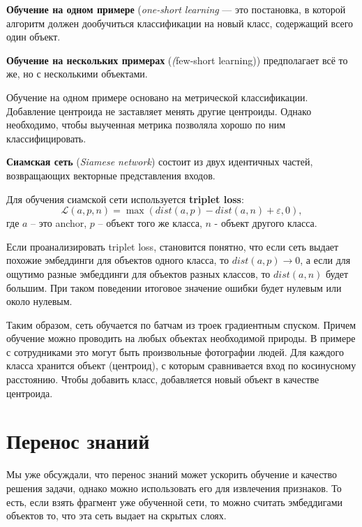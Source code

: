 \begin{definition}
    \textbf{Обучение на одном примере} (\textit{one-short learning} --- это постановка, в которой алгоритм должен дообучиться классификации на новый класс, содержащий всего один объект.
\end{definition}

\begin{definition}
    \textbf{Обучение на нескольких примерах} (\textit(few-short learning)) предполагает всё то же, но с несколькими объектами.
\end{definition}

Обучение на одном примере основано на метрической классификации. Добавление центроида не заставляет менять другие центроиды. Однако необходимо, чтобы выученная метрика позволяла хорошо по ним классифицировать.

\begin{definition}
    \textbf{Сиамская сеть} (\textit{Siamese network}) состоит из двух идентичных частей, возвращающих векторные представления входов.
\end{definition}

Для обучения сиамской сети используется \textbf{triplet loss}:
\[
    \mathcal{L}(a, p, n) = \max(dist(a,p)-dist(a,n)+\varepsilon, 0),
\]
где $a$ -- это anchor, $p$ -- объект того же класса, $n$ - объект другого класса.

\begin{remark}
    Если проанализировать triplet loss, становится понятно, что если сеть выдает похожие эмбеддинги для объектов одного класса, то $dist(a,p)\to0$, а если для ощутимо разные эмбеддинги для объектов разных классов, то $dist(a,n)$ будет большим. При таком поведении итоговое значение ошибки будет нулевым или около нулевым.
\end{remark}

Таким образом, сеть обучается по батчам из троек градиентным спуском. Причем обучение можно проводить на любых объектах необходимой природы. В примере с сотрудниками это могут быть произвольные фотографии людей.\newline
Для каждого класса хранится объект (центроид), с которым сравнивается вход по косинусному расстоянию. Чтобы добавить класс, добавляется новый объект в качестве центроида.

\section{Перенос знаний}

Мы уже обсуждали, что перенос знаний может ускорить обучение и качество решения задачи,  однако можно использовать его для извлечения признаков. То есть, если взять фрагмент уже обученной сети, то можно считать эмбеддигами объектов то, что эта сеть выдает на скрытых слоях.

